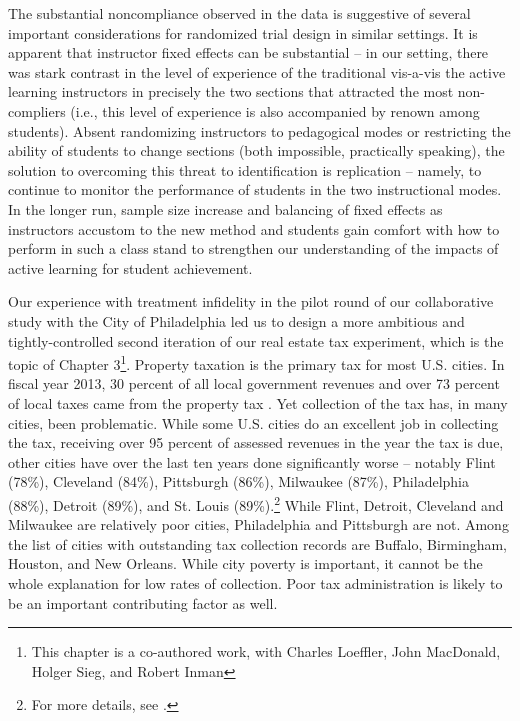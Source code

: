 The substantial noncompliance observed in the data is suggestive of
several important considerations for randomized trial design in similar
settings. It is apparent that instructor fixed effects can be
substantial -- in our setting, there was stark contrast in the level of
experience of the traditional vis-a-vis the active learning instructors
in precisely the two sections that attracted the most non-compliers
(i.e., this level of experience is also accompanied by renown among
students). Absent randomizing instructors to pedagogical modes or
restricting the ability of students to change sections (both impossible,
practically speaking), the solution to overcoming this threat to
identification is replication -- namely, to continue to monitor the
performance of students in the two instructional modes. In the longer
run, sample size increase and balancing of fixed effects as instructors
accustom to the new method and students gain comfort with how to perform
in such a class stand to strengthen our understanding of the impacts of
active learning for student achievement.

Our experience with treatment infidelity in the pilot round of our collaborative study with the City of Philadelphia led us to design a more ambitious and tightly-controlled second iteration of our real estate tax experiment, which is the topic of Chapter 3\footnote{This chapter is a co-authored work, with Charles Loeffler, John MacDonald, Holger Sieg, and Robert Inman}. Property taxation is the primary tax for most U.S. cities.  In fiscal
year 2013, 30 percent of all local government revenues and over 73
percent of local taxes came from the property tax
\cite{barnett2013state}.  Yet collection of the tax has, in many
cities, been problematic.  While some U.S. cities do an excellent job
in collecting the tax, receiving over 95 percent of assessed revenues
in the year the tax is due, other cities have over the last ten years
done significantly worse -- notably Flint (78\%), Cleveland (84\%),
Pittsburgh (86\%), Milwaukee (87\%), Philadelphia (88\%), Detroit
(89\%), and St. Louis (89\%).\footnote{For more details, see
  \cite{CILMS-16}.}  While Flint, Detroit, Cleveland and Milwaukee
are relatively poor cities, Philadelphia and Pittsburgh are not.
Among the list of cities with outstanding tax collection records are
Buffalo, Birmingham, Houston, and New Orleans.  While city poverty is
important, it cannot be the whole explanation for low rates of
collection.  Poor tax administration is likely to be an important
contributing factor as well.

